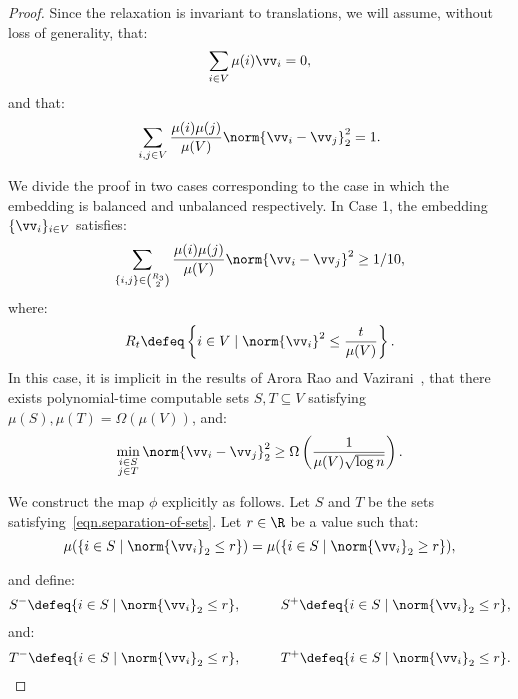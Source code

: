 \documentclass[letterpaper]{article}
\begin{document}
\directedembedding*
\begin{proof}
    Since the relaxation is invariant to translations, we will assume, without loss of generality, that:
    \begin{equation}\label{eqn.zero-mean-embedding}
        \sum_{i\in V} \mu(i)\vv_i = 0,
    \end{equation}
    and that:
    \begin{equation}\label{eq.normalized-variance}
        \sum_{i,j \in V} {\mu(i) \mu(j) \over\mu(V)}\norm{\vv_i - \vv_j}_2^2 = 1.
    \end{equation}

    We divide the proof in two cases corresponding to the case in which the embedding is balanced and unbalanced respectively. In Case 1, the embedding $\{\vv_i\}_{i\in V}$ satisfies:
    \[
        \sum_{\{i,j\}\in \binom{R_3}{2}} {\mu(i) \mu(j) \over \mu(V)} \norm{\vv_i - \vv_j}^2 \geq 1/10,
    \]
    where:
    \[
        R_{t} \defeq \left\{i\in V \mid \norm{\vv_i}^2 \leq {t\over \mu(V)}\right\}.
    \]
    In this case, it is implicit in the results of Arora Rao and Vazirani~\cite{ARV2009}, that there exists polynomial-time computable sets $S,T\subseteq V$ satisfying $\mu(S),\mu(T) = \Omega(\mu(V))$, and:
    \begin{equation}\label{eqn.separation-of-sets}
        \min_{\substack{i\in S\\ j \in T}} \norm{\vv_i - \vv_j}_2^2 \geq \Omega\left({1 \over \mu(V) \sqrt{\log n}}\right).
    \end{equation}

    We construct the map $\phi$ explicitly as follows. Let $S$ and $T$ be the sets satisfying~\eqref{eqn.separation-of-sets}.
    Let $r \in \R$ be a value such that:
    \[
        \mu(\{ i\in S \mid \norm{\vv_i}_2 \leq r\} ) = \mu(\{ i\in S \mid \norm{\vv_i}_2 \geq r\}),
    \]

    \noindent
    and define:
    \[
        S^- \defeq \{ i\in S \mid \norm{\vv_i}_2 \leq r\} , \hspace{1cm} S^+ \defeq \{ i\in S \mid \norm{\vv_i}_2 \leq r\},
    \]
    and:
    \[
        T^- \defeq \{ i\in S \mid \norm{\vv_i}_2 \leq r\} , \hspace{1cm} T^+ \defeq \{ i\in S \mid \norm{\vv_i}_2 \leq r\}.
    \]


\end{proof}
\end{document}
